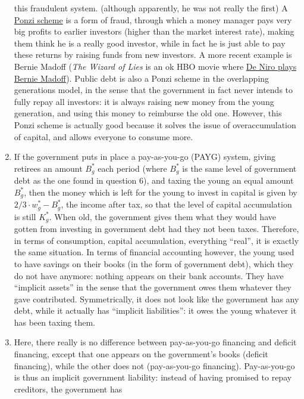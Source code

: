 \documentclass[]{book}
\theoremstyle{definition}
\theoremstyle{definition}
\theoremstyle{definition}
\theoremstyle{remark}
\begin{document}
\begin{enumerate}
  this fraudulent system. (although apparently, he was not really the
  first) A \href{https://en.wikipedia.org/wiki/Ponzi_scheme}{Ponzi
  scheme} is a form of fraud, through which a money manager pays very
  big profits to earlier investors (higher than the market interest
  rate), making them think he is a really good investor, while in fact
  he is just able to pay these returns by raising funds from new
  investors. A more recent example is Bernie Madoff (\emph{The Wizard of
  Lies} is an ok HBO movie where
  \href{https://www.youtube.com/watch?v=7JcZ8QFn6U0}{De Niro plays
  Bernie Madoff}). Public debt is also a Ponzi scheme in the overlapping
  generations model, in the sense that the government in fact never
  intends to fully repay all investors: it is always raising new money
  from the young generation, and using this money to reimburse the old
  one. However, this Ponzi scheme is actually good because it solves the
  issue of overaccumulation of capital, and allows everyone to consume
  more.
\item
  If the government puts in place a pay-as-you-go (PAYG) system, giving
  retirees an amount \(B^{*}_g\) each period (where \(B^{*}_g\) is the
  same level of government debt as the one found in question 6), and
  taxing the young an equal amount \(B^{*}_g\), then the money which is
  left for the young to invest in capital is given by
  \(2/3 \cdot w^{*}_g - B^{*}_g\), the income after tax, so that the
  level of capital accumulation is still \(K^{*}_g\). When old, the
  government gives them what they would have gotten from investing in
  government debt had they not been taxes. Therefore, in terms of
  consumption, capital accumulation, everything ``real'', it is exactly
  the same situation. In terms of financial accounting however, the
  young used to have savings on their books (in the form of government
  debt), which they do not have anymore: nothing appears on their bank
  accounts. They have ``implicit assets'' in the sense that the
  government owes them whatever they gave contributed. Symmetrically, it
  does not look like the government has any debt, while it actually has
  ``implicit liabilities'': it owes the young whatever it has been
  taxing them.
\item
  Here, there really is no difference between pay-as-you-go financing
  and deficit financing, except that one appears on the government's
  books (deficit financing), while the other does not (pay-as-you-go
  financing). Pay-as-you-go is thus an implicit government liability:
  instead of having promised to repay creditors, the government has

\end{enumerate}
\end{document}
